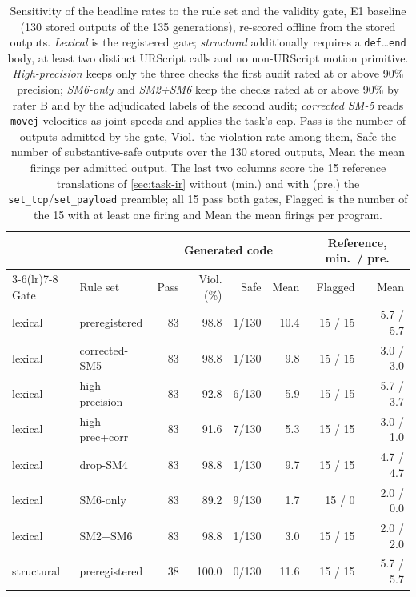 \begin{table}[t]
\caption{Sensitivity of the headline rates to the rule set and the validity gate,
E1 baseline (130 stored outputs of the 135 generations), re-scored offline from the stored outputs.
\emph{Lexical} is the registered gate; \emph{structural} additionally requires a
\texttt{def}\ldots\texttt{end} body, at least two distinct URScript calls and no
non-URScript motion primitive. \emph{High-precision} keeps only the three checks the
first audit rated at or above 90\% precision; \emph{SM6-only} and \emph{SM2+SM6} keep the
checks rated at or above 90\% by rater B and by the adjudicated labels of the second
audit; \emph{corrected SM-5} reads
\texttt{movej} velocities as joint speeds and applies the task's cap. Pass is the number
of outputs admitted by the gate, Viol.\ the violation rate among them, Safe the number of
substantive-safe outputs over the 130 stored outputs, Mean the mean firings per admitted output.
The last two columns score the 15 reference translations of \ref{sec:task-ir} without
(min.) and with (pre.) the \texttt{set\_tcp}/\texttt{set\_payload} preamble; all 15 pass
both gates, Flagged is the number of the 15 with at least one firing and Mean the mean
firings per program.}
\label{tab:sensitivity}
\centering
\scriptsize
\setlength{\tabcolsep}{2.5pt}
\begin{tabular}{@{}llrrrrrr@{}}
\toprule
 & & \multicolumn{4}{c}{Generated code} & \multicolumn{2}{c}{Reference, min.\ / pre.} \\
\cmidrule(lr){3-6}\cmidrule(lr){7-8}
Gate & Rule set & Pass & Viol. (\%) & Safe & Mean & Flagged & Mean \\
\midrule
lexical & preregistered & 83 & 98.8 & 1/130 & 10.4 & 15 / 15 & 5.7 / 5.7 \\
lexical & corrected-SM5 & 83 & 98.8 & 1/130 & 9.8 & 15 / 15 & 3.0 / 3.0 \\
lexical & high-precision & 83 & 92.8 & 6/130 & 5.9 & 15 / 15 & 5.7 / 3.7 \\
lexical & high-prec+corr & 83 & 91.6 & 7/130 & 5.3 & 15 / 15 & 3.0 / 1.0 \\
lexical & drop-SM4 & 83 & 98.8 & 1/130 & 9.7 & 15 / 15 & 4.7 / 4.7 \\
lexical & SM6-only & 83 & 89.2 & 9/130 & 1.7 & 15 / 0 & 2.0 / 0.0 \\
lexical & SM2+SM6 & 83 & 98.8 & 1/130 & 3.0 & 15 / 15 & 2.0 / 2.0 \\
\addlinespace
structural & preregistered & 38 & 100.0 & 0/130 & 11.6 & 15 / 15 & 5.7 / 5.7 \\

\end{tabular}
\end{table}
